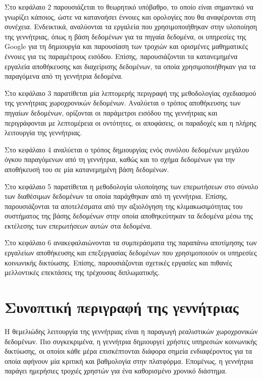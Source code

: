 Στο κεφάλαιο 2 παρουσιάζεται το θεωρητικό υπόβαθρο, το οποίο είναι σημαντικό να γνωρίζει κάποιος, ώστε να κατανοήσει έννοιες και ορολογίες που θα αναφέρονται 
στη συνέχεια. Ενδεικτικά, αναλύονται τα εργαλεία που χρησιμοποιήθηκαν στην υλοποίηση της γεννήτριας, όπως η βάση δεδομένων για τα πηγαία δεδομένα, 
οι υπηρεσίες της Google για τη δημιουργία και παρουσίαση των τροχιών και ορισμένες μαθηματικές έννοιες για τις παραμέτρους εισόδου. Επίσης, \linebreak 
παρουσιάζονται τα κατανεμημένα εργαλεία αποθήκευσης και διαχείρισης δεδομένων, τα οποία χρησιμοποιήθηκαν για τα παραγόμενα από τη γεννήτρια δεδομένα. 

Στο κεφάλαιο 3 παρατίθεται μία λεπτομερής περιγραφή της μεθοδολογίας σχεδιασμού της γεννήτριας χωροχρονικών δεδομένων. Αναλύεται ο τρόπος αποθήκευσης των πηγαίων 
δεδομένων, ορίζονται οι παράμετροι εισόδου της γεννήτριας και περιγράφονται με λεπτομέρεια οι οντότητες, οι αποφάσεις, οι παραδοχές και η πλήρης λειτουργία της 
γεννήτριας. 

Στο κεφάλαιο 4 αναλύεται ο τρόπος δημιουργίας ενός συνόλου δεδομένων μεγάλου όγκου παραγόμενων από τη γεννήτρια, καθώς και το σχήμα δεδομένων για την αποθήκευσή του 
σε μία κατανεμημένη βάση δεδομένων. 

Στο κεφάλαιο 5 παρατίθεται η μεθοδολογία υλοποίησης των επερωτήσεων στο σύνολο των διαθέσιμων δεδομένων τα οποία παράχθηκαν από τη γεννήτρια. Επίσης, 
παρουσιάζονται τα αποτελέσματα από την αξιολόγηση της κλιμακωσιμότητας του συστήματος της βάσης δεδομένων στην οποία αποθηκεύτηκαν τα δεδομένα μέσω 
της εκτέλεσης των επερωτήσεων αυτών στα δεδομένα. 

Στο κεφάλαιο 6 ανακεφαλαιώνονται τα συμπεράσματα της παραπάνω αποτίμησης των \linebreak εργαλείων αποθήκευσης και επεξεργασίας δεδομένων που χρησιμοποιούν 
οι υπηρεσίες κοινωνικής δικτύωσης. Επίσης, παρουσιάζονται σχετικές εργασίες και πιθανές 
μελλοντικές επεκτάσεις της τρέχουσας διπλωματικής. 


\section{Συνοπτική περιγραφή της γεννήτριας}

Η θεμελιώδης λειτουργία της γεννήτριας είναι η παραγωγή ρεαλιστικών χωροχρονικών \linebreak δεδομένων. 
Πιο συγκεκριμένα, η γεννήτρια δημιουργεί χρήστες υπηρεσιών κοινωνικής δικτύωσης, οι οποίοι κάθε μέρα επισκέπτονται διάφορα 
σημεία ενδιαφέροντος για τα οποία αφήνουν μία κριτική και βαθμολογία στην πλατφόρμα. Επομένως, η γεννήτρια παράγει ημερήσιες τροχιές χρηστών για ένα 
καθορισμένο χρονικό διάστημα. 

